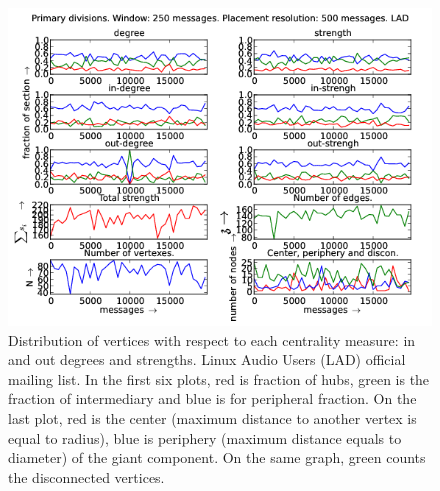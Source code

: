 \documentclass[%
 aip,
 jmp,%
 amsmath,amssymb,
 reprint,%
]{revtex4-1}
\begin{document}
\begin{figure}[hbtp] 
   \centering
        \includegraphics[width=\textwidth]{figs/LAD/250}
    \caption{Distribution of vertices with respect to each centrality measure: in and out degrees and strengths. Linux Audio Users (LAD) official mailing list. In the first six plots, red is fraction of hubs, green is the fraction of intermediary and blue is for peripheral fraction. On the last plot, red is the center (maximum distance to another vertex is equal to radius), blue is periphery (maximum distance equals to diameter) of the giant component. On the same graph, green counts the disconnected vertices.}
    \label{fig:lad250}
\end{figure}
\end{document}
